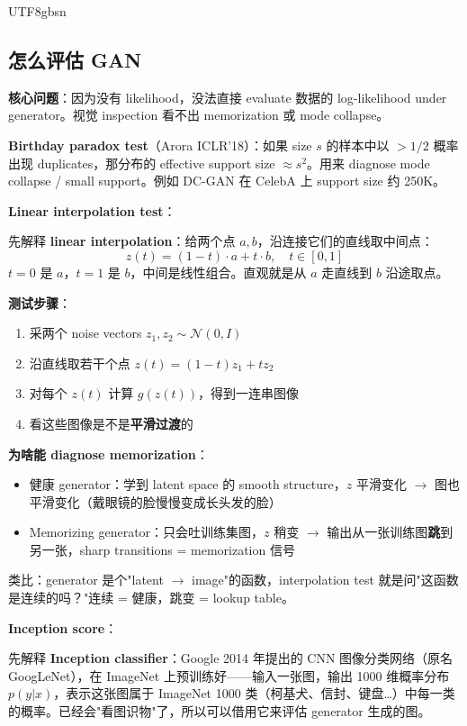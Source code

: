 \documentclass[11pt]{article}
\begin{document}
\begin{CJK}{UTF8}{gbsn}
\subsection{怎么评估 GAN}

\textbf{核心问题}：因为没有 likelihood，没法直接 evaluate 数据的 log-likelihood under generator。视觉 inspection 看不出 memorization 或 mode collapse。

\textbf{Birthday paradox test}（Arora ICLR'18）：如果 size $s$ 的样本中以 $> 1/2$ 概率出现 duplicates，那分布的 effective support size $\approx s^2$。用来 diagnose mode collapse / small support。例如 DC-GAN 在 CelebA 上 support size 约 250K。

\textbf{Linear interpolation test}：

先解释 \textbf{linear interpolation}：给两个点 $a, b$，沿连接它们的直线取中间点：
\[
z(t) = (1-t) \cdot a + t \cdot b, \quad t \in [0, 1]
\]
$t=0$ 是 $a$，$t=1$ 是 $b$，中间是线性组合。直观就是从 $a$ 走直线到 $b$ 沿途取点。

\textbf{测试步骤}：
\begin{enumerate}[nosep]
  \item 采两个 noise vectors $z_1, z_2 \sim \mathcal{N}(0, I)$
  \item 沿直线取若干个点 $z(t) = (1-t) z_1 + t z_2$
  \item 对每个 $z(t)$ 计算 $g(z(t))$，得到一连串图像
  \item 看这些图像是不是\textbf{平滑过渡}的
\end{enumerate}

\textbf{为啥能 diagnose memorization}：
\begin{itemize}[nosep]
  \item 健康 generator：学到 latent space 的 smooth structure，$z$ 平滑变化 $\to$ 图也平滑变化（戴眼镜的脸慢慢变成长头发的脸）
  \item Memorizing generator：只会吐训练集图，$z$ 稍变 $\to$ 输出从一张训练图\textbf{跳}到另一张，sharp transitions = memorization 信号
\end{itemize}

类比：generator 是个"latent $\to$ image"的函数，interpolation test 就是问"这函数是连续的吗？"连续 = 健康，跳变 = lookup table。

\textbf{Inception score}：

先解释 \textbf{Inception classifier}：Google 2014 年提出的 CNN 图像分类网络（原名 GoogLeNet），在 ImageNet 上预训练好——输入一张图，输出 1000 维概率分布 $p(y|x)$，表示这张图属于 ImageNet 1000 类（柯基犬、信封、键盘…）中每一类的概率。已经会"看图识物"了，所以可以借用它来评估 generator 生成的图。


\end{CJK}
\end{document}
